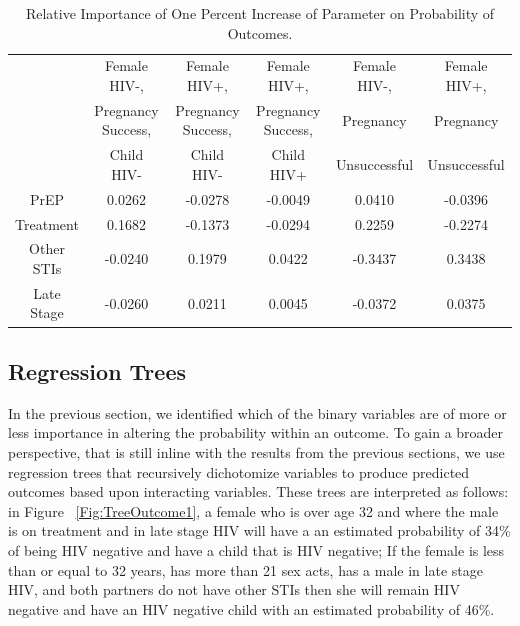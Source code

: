 \documentclass[11pt]{nih_mod}
\begin{document}
\begin{table}	
\begin{center}
\begin{tabular}{|c|c|c|c|c|c|}
\hline
 & Female HIV-,  & Female HIV+, & Female HIV+, & Female HIV-, & Female HIV+,\\ 
 & Pregnancy Success,& Pregnancy Success,&Pregnancy Success,& Pregnancy& Pregnancy\\ 
 & Child HIV-&Child HIV-&Child HIV+&Unsuccessful&Unsuccessful\\ 
\hline
\hline
PrEP & 0.0262 & -0.0278 & -0.0049 & 0.0410 & -0.0396\\ 
Treatment & 0.1682 & -0.1373 & -0.0294 & 0.2259 & -0.2274\\
Other STIs &-0.0240 & 0.1979 & 0.0422 & -0.3437 & 0.3438\\
Late Stage & -0.0260 & 0.0211 & 0.0045 & -0.0372 & 0.0375\\
\hline
\end{tabular}
	\caption{Relative Importance of One Percent Increase of Parameter on Probability of Outcomes. \label{tab:OnePercentIncr}}
\end{center}
\end{table}


\subsection{Regression Trees}
In the previous section, we identified which of the binary variables are of more or less importance in altering the probability within an outcome.  To gain a broader perspective, that is still inline with the results from the previous sections, we use regression trees that recursively dichotomize variables to produce predicted outcomes based upon interacting variables.  These trees are interpreted as follows: in Figure ~\ref{Fig:TreeOutcome1}, a female who is over age 32 and where the male is on treatment and in late stage HIV will have a an estimated probability of 34\% of being HIV negative and have a child that is HIV negative; If the female is less than or equal to 32 years, has more than 21 sex acts, has a male in late stage HIV, and both partners do not have other STIs then she will remain HIV negative and have an HIV negative child with an estimated probability of 46\%.
\end{document}
